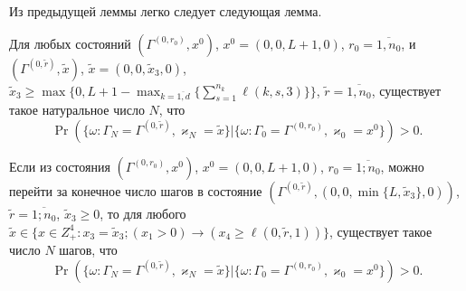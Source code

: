 \documentclass{report}
\begin{document}
Из предыдущей леммы легко следует следующая лемма.
\begin{lemma}
Для любых состояний $(\Gamma^{(0,r_0)},x^0)$, $x^0=(0,0,L+1,0)$,  $r_0=\overline{1,n_0}$, и
$(\Gamma^{(0,\tilde{r})},\tilde{x})$,
$\tilde{x}=(0,0,\tilde{x}_3,0)$, $\tilde{x}_3\geqslant \max{\{0,L+1-\max_{k=\overline{1,d}}{\{ \sum_{s=1}^{n_k}\ell(k,s,3)\}}\}}$,
$\tilde{r} = \overline{1,n_0}$, существует такое натуральное число $N$, что 
\begin{equation*}
\Pr(\{\omega\colon \Gamma_{N}=\Gamma^{(0,\tilde{r} )}, \varkappa_{N}=\tilde{x}\}|\{\omega\colon 
\Gamma_{0}=\Gamma^{(0,r_0)}, \varkappa_{0}=x^0\})>0.
\end{equation*}
\end{lemma}

\begin{lemma}
Если из состояния $(\Gamma^{(0,r_0)},x^0)$, $x^0=(0,0,L+1,0)$, $r_0=\overline{1;n_0}$, можно перейти за конечное число шагов в состояние $(\Gamma^{(0,\tilde{r})},(0,0,\min\{L,\tilde{x}_3\},0))$, $\tilde{r}=\overline{1;n_0}$, $\tilde{x}_3\geqslant 0$, то для любого $\tilde{x}\in \{x \in Z_+^4\colon x_3=\tilde{x}_3; (x_1 > 0)\rightarrow (x_4\geqslant \ell(0,\tilde{r},1))\}$, существует такое число $N$ шагов, что
\begin{equation*}
\Pr(\{\omega\colon \Gamma_{N}=\Gamma^{(0,\tilde{r} )}, \varkappa_{N}=\tilde{x}\}|\{\omega\colon 
\Gamma_{0}=\Gamma^{(0,r_0)}, \varkappa_{0}=x^0\})>0.
\end{equation*}
\end{lemma}
\end{document}
